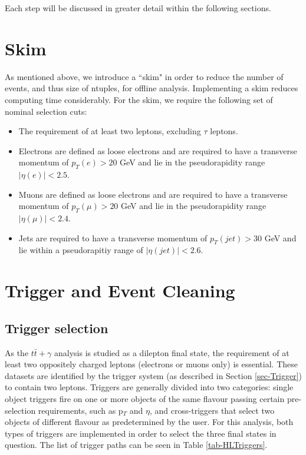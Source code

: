 Each step will be discussed in greater detail within the following sections. 

\section{Skim}

As mentioned above, we introduce a ``skim" in order to reduce the number of events, and thus size of ntuples, for offline analysis. Implementing a skim reduces computing time considerably. For the skim, we require the following set of nominal selection cuts:

\begin{itemize}
	\item The requirement of at least two leptons, excluding $\tau$ leptons.
	\item Electrons are defined as loose electrons and are required to have a transverse momentum of $p_T(e) > 20$ GeV and lie in the pseudorapidity range $|\eta(e)| < 2.5$.
	\item Muons are defined as loose electrons and are required to have a transverse momentum of $p_T(\mu) > 20$ GeV and lie in the pseudorapidity range $|\eta(\mu)| < 2.4$.
	\item Jets are required to have a transverse momentum of $p_T(jet) > 30$ GeV and lie within a pseudorapitiy range of $|\eta(jet)| < 2.6$.
\end{itemize}

\section{Trigger and Event Cleaning} \label{sec-TriggerAndEventCleaning}

\subsection{Trigger selection}

As the $t\bar{t}+\gamma$ analysis is studied as a dilepton final state, the requirement of at least two oppositely charged leptons (electrons or muons only) is essential. These datasets are identified by the trigger system (as described in Section \ref{sec-Trigger}) to contain two leptons. Triggers are generally divided into two categories: single object triggers fire on one or more objects of the same flavour passing certain pre-selection requirements, such as p$_T$ and $\eta$, and cross-triggers that select two objects of different flavour as predetermined by the user. For this analysis, both types of triggers are implemented in order to select the three final states in question. The list of trigger paths can be seen in Table \ref{tab-HLTriggers}. 

